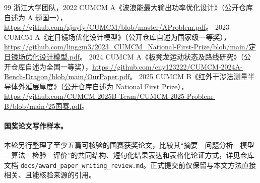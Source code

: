 \begin{thebibliography}{99}
浙江大学团队，2022 CUMCM A《波浪能最大输出功率优化设计》（公开仓库自述为 A 题国一），\url{https://github.com/zjuyfy/CUMCM/blob/master/AProblem.pdf}。
2023 CUMCM A《定日镜场优化设计模型》（公开仓库自述为国家级一等奖），\url{https://github.com/linggm3/2023_CUMCM_National-First-Prize/blob/main/定日镜场优化设计模型.pdf}。
2024 CUMCM A《板凳龙运动状态及路线研究》（公开仓库自述为全国一等奖），\url{https://github.com/cny123222/CUMCM-2024A-Bench-Dragon/blob/main/OurPaper.pdf}。
2025 CUMCM B《红外干涉法测量半导体外延层厚度》（公开仓库自述为 National First Prize），\url{https://github.com/CUMCM-2025B-Team/CUMCM-2025-Problem-B/blob/main/25国赛.pdf}。
\end{thebibliography}

\paragraph{国奖论文写作样本。}本轮另行整理了至少五篇可核验的国赛获奖论文，比较其“摘要—问题分析—模型—算法—检验—评价”的共同结构、短句化结果表达和表格化论证方式，详见仓库文档 \texttt{docs/award\_paper\_writing\_review.md}。正式提交前仅保留与本文方法直接相关、且能核验来源的引用。

